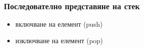 \documentclass[alsotrans]{beamerswitch}
\begin{document}
\begin{frame}
  \frametitle{Последователно представяне на стек}

  \begin{center}
  \end{center}

  \begin{itemize}
  \item<2-> включване на елемент (push)
  \item<3-> изключване на елемент (pop)
  \end{itemize}
\end{frame}
\end{document}
